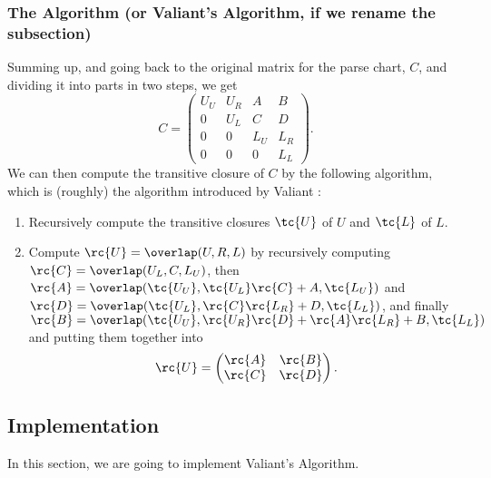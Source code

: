 \subsubsection{The Algorithm (or Valiant's Algorithm, if we rename the subsection)}
Summing up, and going back to the original matrix for the parse chart, $C$, and dividing it into parts in two steps, we get
\begin{equation}
  C =
  \begin{pmatrix}
    U_U & U_R & A   & B \\
    0   & U_L & C   & D \\
    0   &   0 & L_U & L_R \\
    0   &   0 & 0   & L_L 
  \end{pmatrix}.
\end{equation}
We can then compute the transitive closure of $C$ by the following algorithm, which is (roughly) the algorithm introduced by Valiant \cite{Valiant}:
\begin{enumerate}
\item Recursively compute the transitive closures $\tc{U}$ of $U$ and $\tc{L}$ of $L$.
\item Compute $\rc{U} = \overlap(U,R,L)$ by recursively computing $\rc{C} = \overlap(U_L, C, L_U)$, then $\rc{A} = \overlap( \tc{U_U} , \tc{U_L}\rc{C} + A , \tc{L_U} )$ and $\rc{D} = \overlap( \tc{U_L} , \rc{C}\rc{L_R} +  D , \tc{L_L} )$, and finally $\rc{B} = \overlap( \tc{U_U} , \rc{U_R}\rc{D} + \rc{A}\rc{L_R} + B , \tc{L_L})$ and putting them together into 
  \begin{equation*}
    \rc{U} = 
    \begin{pmatrix}
      \rc{A} & \rc{B} \\
      \rc{C} & \rc{D} 
    \end{pmatrix}.
  \end{equation*}
\end{enumerate}
\subsection{Implementation}
In this section, we are going to implement Valiant's Algorithm.
